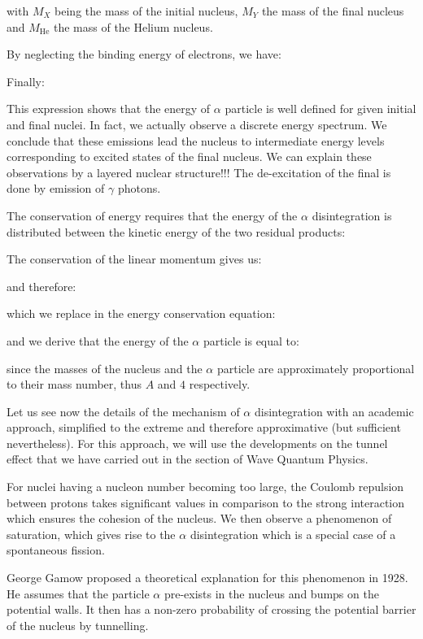 	with $M_X$ being the mass of the initial nucleus, $M_Y$ the mass of the final nucleus and $M_\text{He}$ the mass of the Helium nucleus.

	By neglecting the binding energy of electrons, we have:
	
	Finally:
	
	This expression shows that the energy of $\alpha$ particle is well defined for given initial and final nuclei. In fact, we actually observe a discrete energy spectrum. We conclude that these emissions lead the nucleus to intermediate energy levels corresponding to excited states of the final nucleus. We can explain these observations by a layered nuclear structure!!! The de-excitation of the final is done by emission of $\gamma$ photons.

	The conservation of energy requires that the energy of the $\alpha$ disintegration is distributed between the kinetic energy of the two residual products:
	
	The conservation of the linear momentum gives us:
	
	and therefore:
	
	which we replace in the energy conservation equation:
	
	and we derive that the energy of the $\alpha$ particle is equal to:
	
	since the masses of the nucleus and the $\alpha$ particle are approximately proportional to their mass number, thus $A$ and $4$ respectively.
	
	Let us see now the details of the mechanism of $\alpha$ disintegration with an academic approach, simplified to the extreme and therefore approximative (but sufficient nevertheless). For this approach, we will use the developments on the tunnel effect that we have carried out in the section of Wave Quantum Physics.

	For nuclei having a nucleon number becoming too large, the Coulomb repulsion between protons takes significant values in comparison to the strong interaction which ensures the cohesion of the nucleus. We then observe a phenomenon of saturation, which gives rise to the $\alpha$ disintegration which is a special case of a spontaneous fission.

	George Gamow proposed a theoretical explanation for this phenomenon in 1928. He assumes that the particle $\alpha$ pre-exists in the nucleus and bumps on the potential walls. It then has a non-zero probability of crossing the potential barrier of the nucleus by tunnelling.

